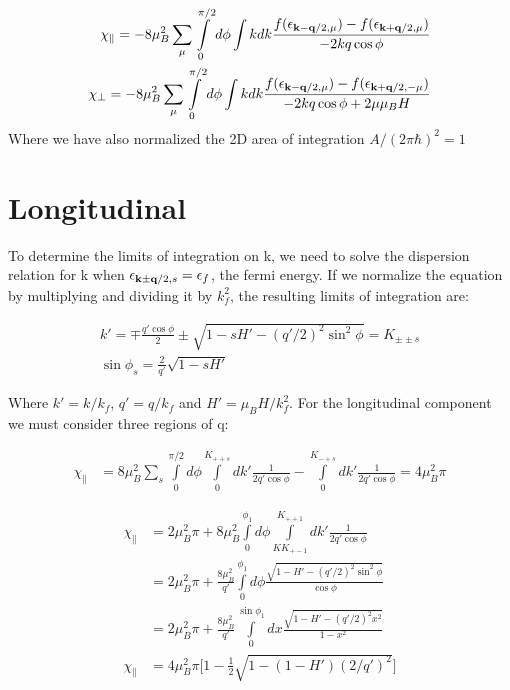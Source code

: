 \documentclass[prb,showpacs,amssymb,amsmath,twocolumn]{revtex4-1}
\begin{document}
\begin{widetext}
 \begin{align*}
 \chi_\parallel=-8\mu_B^2\sum\limits_\mu \int\limits_0^{\pi/2} d\phi \int k dk  \frac{ f(\epsilon_{{\bf k-q}/2,\mu})-f(\epsilon_{{\bf k+q}/2,\mu})}{ -2kq\cos\phi} \\
  \chi_\perp=-8\mu_B^2\sum\limits_{\mu} \int\limits_0^{\pi/2} d\phi \int k dk  \frac{ f(\epsilon_{{\bf k-q}/2,\mu})-f(\epsilon_{{\bf k+q}/2,-\mu})}{ -2kq\cos\phi+2\mu \mu_B H}
 \end{align*}
 Where we have also normalized the 2D area of integration $A/(2\pi \hbar)^2=1$
 \section*{Longitudinal}
 To determine the limits of integration on k, we need to solve the dispersion relation for k when $\epsilon_{{\bf k\pm q}/2,s}=\epsilon_f$, the fermi energy. If we normalize the equation by multiplying and dividing it by $k_f^2$, the resulting limits of integration are:
 
 \begin{align*}
k'=\mp \frac{q'\cos\phi}{2} \pm\sqrt{1-sH'-(q'/2)^2\sin^2\phi} = K_{\pm\pm s} \\
\sin{\phi_s}=\frac{2}{q'}\sqrt{1-sH'} 
 \end{align*}
 
 Where $k'=k/k_f$, $q'=q/k_f$ and $H'=\mu_B H/k_f^2$. For the longitudinal component we must consider three regions of q:%
 
 \begin{align*}
\chi_\parallel&=8\mu_B^2\sum\limits_s \int\limits_0^{\pi/2} d\phi \int\limits_0^{K_{++s}}dk'  \frac{ 1}{ 2q'\cos\phi}-\int\limits_0^{K_{-+s}} dk'  \frac{ 1}{ 2q'\cos\phi} =4\mu_B^2\pi
 \end{align*}
 
 \begin{align*}
\chi_\parallel&=2\mu_B^2\pi +8\mu_B^2\int\limits_0^{\phi_1} d\phi \int\limits_{KK_{+-1}}^{K_{++1}}dk'  \frac{ 1}{ 2q'\cos\phi} \\
&=2\mu_B^2\pi +\frac{8\mu_B^2}{q'}\int\limits_0^{\phi_1} d\phi  \frac{ \sqrt{1-H'-(q'/2)^2\sin^2\phi}}{ \cos\phi} \\
&=2\mu_B^2\pi +\frac{8\mu_B^2}{q'}\int\limits_0^{\sin\phi_1} dx  \frac{ \sqrt{1-H'-(q'/2)^2 x^2}}{ 1-x^2}  \\
\chi_\parallel&=4\mu_B^2\pi\bigg[1 - \frac{1}{2}\sqrt{1-(1-H')(2/q')^2}\bigg]  \\
 \end{align*}
 

\end{widetext}
\end{document}
